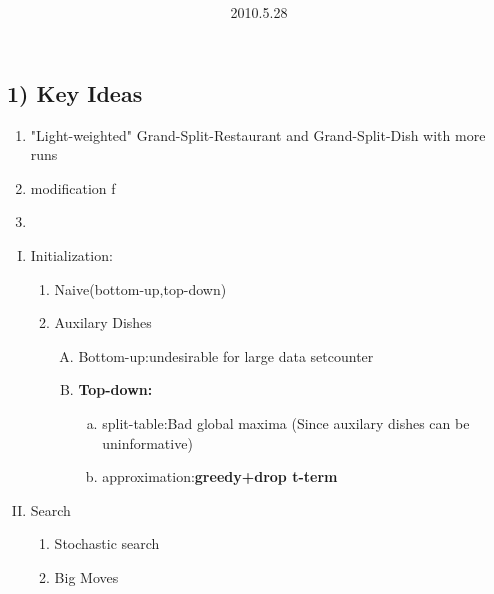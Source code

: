 \documentclass{article}
\title{\vspace{0.3in}\textmd{\textbf{\hmwkTitle}}}
\date{2010.5.28}
\author{\textbf{\hmwkAuthorName}}
\begin{document}
\begin{spacing}{1.1}
\maketitle

\section{1) Key Ideas}

\begin{enumerate}
\item "Light-weighted" Grand-Split-Restaurant and Grand-Split-Dish with more runs 
\item modification f
\item 
\end{enumerate}



\begin{enumerate}[(I)]
 \item Initialization:\\
       \begin{enumerate}[(1)]
        \item Naive(bottom-up,top-down) 
        \item Auxilary Dishes
       \begin{enumerate}[(A)]
       \item Bottom-up:undesirable for large data setcounter
       \item {\bf Top-down:}
      \begin{enumerate}[(a)]
       \item split-table:Bad global maxima (Since auxilary dishes can be uninformative)
       \item approximation:{\bf greedy+drop t-term}
       \end{enumerate}
       \end{enumerate}
       \end{enumerate}

\item Search
   \begin{enumerate}[(1)]
     \item Stochastic search
     \item Big Moves
       \end{enumerate}

\end{enumerate}


\end{spacing}
\end{document}
